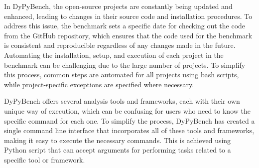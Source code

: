 In DyPyBench, the open-source projects are constantly being updated and enhanced, leading to changes in their source code and installation procedures. To address this issue, the benchmark sets a specific date for checking out the code from the GitHub repository, which ensures that the code used for the benchmark is consistent and reproducible regardless of any changes made in the future. Automating the installation, setup, and execution of each project in the benchmark can be challenging due to the large number of projects. To simplify this process, common steps are automated for all projects using bash scripts, while project-specific exceptions are specified where necessary.

DyPyBench offers several analysis tools and frameworks, each with their own unique way of execution, which can be confusing for users who need to know the specific command for each one. To simplify the process, DyPyBench has created a single command line interface that incorporates all of these tools and frameworks, making it easy to execute the necessary commands. This is achieved using Python script that can accept arguments for performing tasks related to a specific tool or framework.
